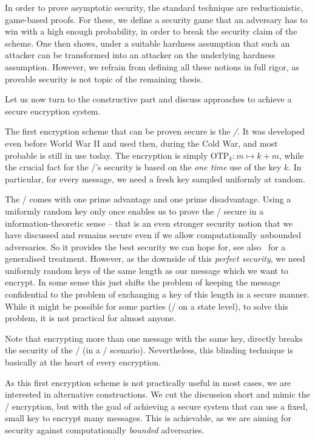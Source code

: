 In order to prove asymptotic security, the standard technique are reductionistic, game-based proofs.
For these, we define a security game that an adversary has to win with a high enough probability, in order to break the security claim of the scheme.
One then shows, under a suitable hardness assumption that such an attacker can be transformed into an attacker on the underlying hardness assumption.
However, we refrain from defining all these notions in full rigor, as provable security is not topic of the remaining thesis.

Let us now turn to the constructive part and discuss approaches to achieve a secure encryption system.

The first encryption scheme that can be proven secure is the \emph{\OTP/}.
It was developed even before World War II and used then, during the Cold War, and most probable is still in use today.
The encryption is simply $\mathrm{OTP}_k : m \mapsto k + m$, while the crucial fact for the \OTP/'s security is based on the \emph{one time} use of the key $k$.
In particular, for every message, we need a fresh key sampled uniformly at random.

The \OTP/ comes with one prime advantage and one prime disadvantage.
Using a uniformly random key only once enables us to prove the \OTP/ secure in a information-theoretic sense -- that is an even stronger security notion that we have discussed and remains secure even if we allow computationally \emph{un}bounded adversaries.
So it provides the best security we can hope for, see also~\cite[Section~10]{Shannon49} for a generalised treatment.
However, as the downside of this \emph{perfect security}, we need uniformly random keys of the same length as our message which we want to encrypt.
In some sense this just shifts the problem of keeping the message confidential to the problem of exchanging a key of this length in a secure manner.
While it might be possible for some parties (\ie/ on a state level), to solve this problem, it is not practical for almost anyone.

Note that encrypting more than one message with the same key, directly breaks the security of the \OTP/ (in a \KPA/ scenario).
Nevertheless, this blinding technique is basically at the heart of every encryption.

As this first encryption scheme is not practically useful in most cases, we are interested in alternative constructions.
We cut the discussion short and mimic the \OTP/ encryption, but with the goal of achieving a secure system that can use a fixed, small key to encrypt many messages.
This is achievable, as we are aiming for security against computationally \emph{bounded} adversaries.

